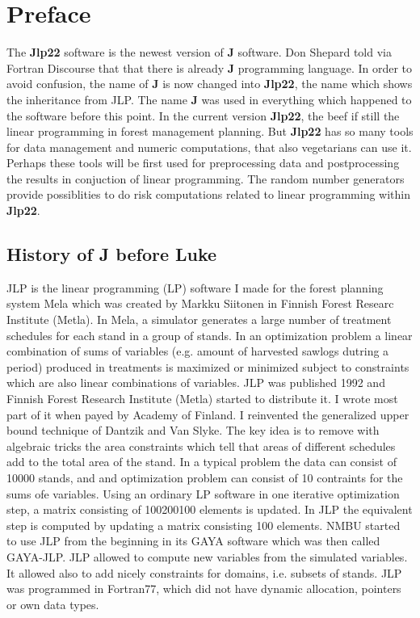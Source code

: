 \section*{Preface}
\label{preface0}
The \textbf{Jlp22} software is the newest version of \textbf{J} software. Don Shepard told via Fortran Discourse that
that there is already \textbf{J} programming language. In order to avoid confusion,
the name of \textbf{J} is now changed
into \textbf{Jlp22}, the name which shows the inheritance from JLP. The name \textbf{J} was used in everything which  happened
to the software before this point.
In the current version \textbf{Jlp22}, the beef if still the linear programming in forest management planning.
But \textbf{Jlp22} has so many tools for
data management and numeric computations,	that also vegetarians can use it.
Perhaps these tools will be first used for preprocessing  data and postprocessing
the results in conjuction of linear programming. The random number generators
provide possiblities to do risk computations related to linear programming within \textbf{Jlp22}.

\subsection*{History of \textbf{J} before Luke}

JLP is the linear programming (LP) software I made for the forest planning system Mela
which was created by Markku Siitonen in Finnish Forest Researc Institute (Metla). In Mela, a simulator generates a large number of treatment schedules
for each stand in a group of stands. In an optimization problem a linear combination of sums of
variables (e.g. amount of harvested sawlogs dutring a period) produced in treatments is maximized or minimized subject to constraints which are also
linear combinations of variables. JLP was published 1992 and
Finnish Forest Research Institute (Metla) started to distribute it.
I wrote most part of it when payed by Academy of Finland. I reinvented  the generalized
upper bound technique of Dantzik and Van Slyke. The key idea is to remove with algebraic tricks
the area constraints which
tell that areas of different schedules add to the total area of the stand. In a typical problem the data can consist of 10000 stands, and and
optimization problem can consist of 10 contraints for the sums ofe variables. Using an ordinary LP software
in one iterative optimization step, a matrix consisting of 100200100 elements is updated.
In JLP the equivalent
step is computed by updating a matrix consisting 100 elements.
NMBU started to use JLP from the beginning in its GAYA software which was then called GAYA-JLP.
JLP allowed to compute new variables from the simulated variables. It allowed also to add
nicely constraints for domains, i.e. subsets of stands. JLP was programmed
in Fortran77, which did not have
dynamic allocation, pointers or own data types.


